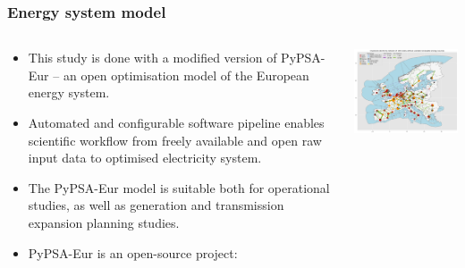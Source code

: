 \begin{frame}
  \frametitle{Energy system model}

  \begin{columns}[T]
  \begin{column}{7cm}
  {\footnotesize
  \begin{itemize}
  \item This study is done with a modified version of \alert{PyPSA-Eur} -- an open optimisation model of the European energy system.
  \item Automated and configurable software pipeline enables scientific workflow from freely available and open raw input data to optimised electricity system. 
  \item The PyPSA-Eur model is suitable both for operational studies, as well as generation and transmission expansion planning studies. 
  \item  PyPSA-Eur is an open-source project: \\
  \faGithub~ \\
  \faBook~ \\
  \faLink~ 
  \end{itemize}
  }
  \end{column}

  \begin{column}{9cm}
    \centering
    \vspace{0.1cm}
    \includegraphics[width=8cm]{images/elec_s_100.png}
  \end{column}
  \end{columns}

\end{frame}



